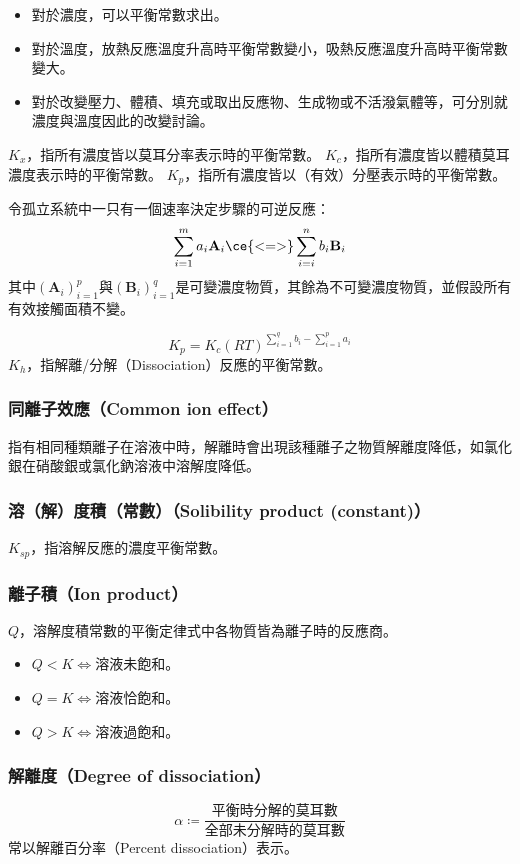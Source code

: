 \documentclass[a4paper,12pt]{article}
\begin{document}
\begin{itemize}
\begin{itemize}
\item 對於濃度，可以平衡常數求出。
\item 對於溫度，放熱反應溫度升高時平衡常數變小，吸熱反應溫度升高時平衡常數變大。
\item 對於改變壓力、體積、填充或取出反應物、生成物或不活潑氣體等，可分別就濃度與溫度因此的改變討論。
\end{itemize}
$K_x$，指所有濃度皆以莫耳分率表示時的平衡常數。
$K_c$，指所有濃度皆以體積莫耳濃度表示時的平衡常數。
$K_p$，指所有濃度皆以（有效）分壓表示時的平衡常數。

令孤立系統中一只有一個速率決定步驟的可逆反應：
\[\sum_{i=1}^ma_i\mathbf{A}_i\ce{<=>}\sum_{i=i}^nb_i\mathbf{B}_i\]
其中$(\mathbf{A}_i)_{i=1}^p$與$(\mathbf{B}_i)_{i=1}^q$是可變濃度物質，其餘為不可變濃度物質，並假設所有有效接觸面積不變。

\[K_p=K_c(RT)^{\sum_{i=1}^qb_i-\sum_{i=1}^pa_i}\]
$K_h$，指解離/分解（Dissociation）反應的平衡常數。
\subsubsection{同離子效應（Common ion effect）}
指有相同種類離子在溶液中時，解離時會出現該種離子之物質解離度降低，如氯化銀在硝酸銀或氯化鈉溶液中溶解度降低。
\subsubsection{溶（解）度積（常數）（Solibility product (constant)）}
$K_{sp}$，指溶解反應的濃度平衡常數。
\subsubsection{離子積（Ion product）}
$Q$，溶解度積常數的平衡定律式中各物質皆為離子時的反應商。
\begin{itemize}
\item $Q<K\iff$溶液未飽和。
\item $Q=K\iff$溶液恰飽和。
\item $Q>K\iff$溶液過飽和。
\end{itemize}
\subsubsection{解離度（Degree of dissociation）}
\[\alpha\coloneq\frac{\text{平衡時分解的莫耳數}}{\text{全部未分解時的莫耳數}}\]
常以解離百分率（Percent dissociation）表示。

\end{itemize}
\end{document}
